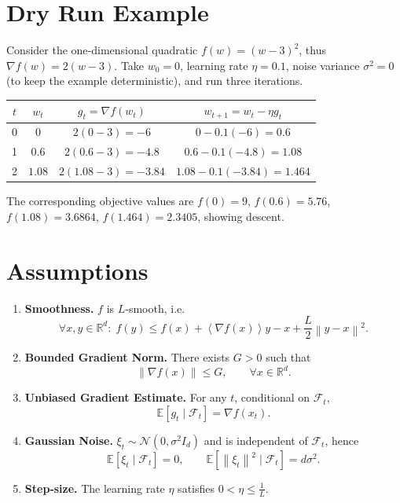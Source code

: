 \documentclass{article}
\newcommand{\EE}{\mathbb{E}}
\newcommand{\RR}{\mathbb{R}}
\newcommand{\norm}[1]{\left\lVert #1 \right\rVert}
\newcommand{\inner}[1]{\left\langle #1 \right\rangle}
\begin{document}
\section*{Dry Run Example}
Consider the one‑dimensional quadratic $f(w)=(w-3)^{2}$, thus $\nabla f(w)=2(w-3)$.
Take $w_{0}=0$, learning rate $\eta=0.1$, noise variance $\sigma^{2}=0$ (to keep the example deterministic), and run three iterations.

\begin{center}
\begin{tabular}{c|c|c|c}
$t$ & $w_{t}$ & $g_{t}= \nabla f(w_{t})$ & $w_{t+1}=w_{t}-\eta g_{t}$\\ \hline
0 & $0$ & $2(0-3)=-6$ & $0-0.1(-6)=0.6$\\
1 & $0.6$ & $2(0.6-3)=-4.8$ & $0.6-0.1(-4.8)=1.08$\\
2 & $1.08$ & $2(1.08-3)=-3.84$ & $1.08-0.1(-3.84)=1.464$\\
\end{tabular}
\end{center}
The corresponding objective values are $f(0)=9$, $f(0.6)=5.76$, $f(1.08)=3.6864$, $f(1.464)=2.3405$,
showing descent.

\newpage

\section*{Assumptions}
\begin{enumerate}
\item \textbf{Smoothness.} $f$ is $L$‑smooth, i.e.
\[
\forall x,y\in\RR^{d}:\;
f(y)\le f(x)+\inner{\nabla f(x)}{y-x}+\frac{L}{2}\norm{y-x}^{2}. \tag{A1}
\]
\item \textbf{Bounded Gradient Norm.} There exists $G>0$ such that
\[
\norm{\nabla f(x)}\le G,\qquad\forall x\in\RR^{d}. \tag{A2}
\]
\item \textbf{Unbiased Gradient Estimate.} For any $t$, conditional on $\mathcal{F}_{t}$,
\[
\EE\!\left[g_{t}\mid\mathcal{F}_{t}\right]=\nabla f(x_{t}). \tag{A3}
\]
\item \textbf{Gaussian Noise.} $\xi_{t}\sim\mathcal{N}(0,\sigma^{2}I_{d})$ and is independent of $\mathcal{F}_{t}$,
hence
\[
\EE[\xi_{t}\mid\mathcal{F}_{t}]=0,\qquad 
\EE\!\left[\norm{\xi_{t}}^{2}\mid\mathcal{F}_{t}\right]=d\sigma^{2}. \tag{A4}
\]
\item \textbf{Step‑size.} The learning rate $\eta$ satisfies $0<\eta\le \frac{1}{L}$. 
\end{enumerate}
\end{document}
